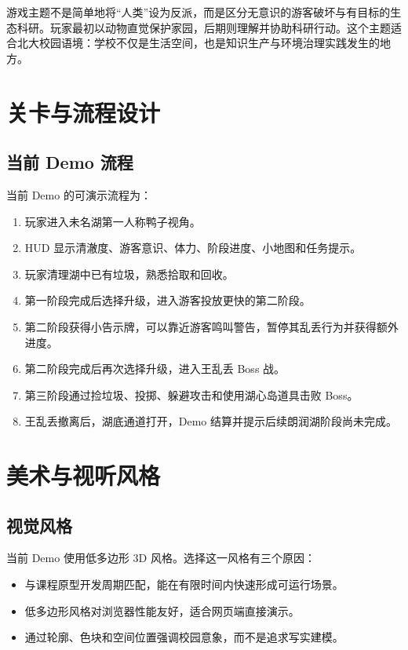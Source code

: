 \documentclass[UTF8,a4paper,12pt]{ctexart}
\begin{document}
游戏主题不是简单地将``人类''设为反派，而是区分无意识的游客破坏与有目标的生态科研。玩家最初以动物直觉保护家园，后期则理解并协助科研行动。这个主题适合北大校园语境：学校不仅是生活空间，也是知识生产与环境治理实践发生的地方。

\section{关卡与流程设计}

\subsection{当前 Demo 流程}

当前 Demo 的可演示流程为：

\begin{enumerate}
  \item 玩家进入未名湖第一人称鸭子视角。
  \item HUD 显示清澈度、游客意识、体力、阶段进度、小地图和任务提示。
  \item 玩家清理湖中已有垃圾，熟悉拾取和回收。
  \item 第一阶段完成后选择升级，进入游客投放更快的第二阶段。
  \item 第二阶段获得小告示牌，可以靠近游客鸣叫警告，暂停其乱丢行为并获得额外进度。
  \item 第二阶段完成后再次选择升级，进入王乱丢 Boss 战。
  \item 第三阶段通过捡垃圾、投掷、躲避攻击和使用湖心岛道具击败 Boss。
  \item 王乱丢撤离后，湖底通道打开，Demo 结算并提示后续朗润湖阶段尚未完成。
\end{enumerate}

\section{美术与视听风格}

\subsection{视觉风格}

当前 Demo 使用低多边形 3D 风格。选择这一风格有三个原因：

\begin{itemize}
  \item 与课程原型开发周期匹配，能在有限时间内快速形成可运行场景。
  \item 低多边形风格对浏览器性能友好，适合网页端直接演示。
  \item 通过轮廓、色块和空间位置强调校园意象，而不是追求写实建模。
\end{itemize}
\end{document}

